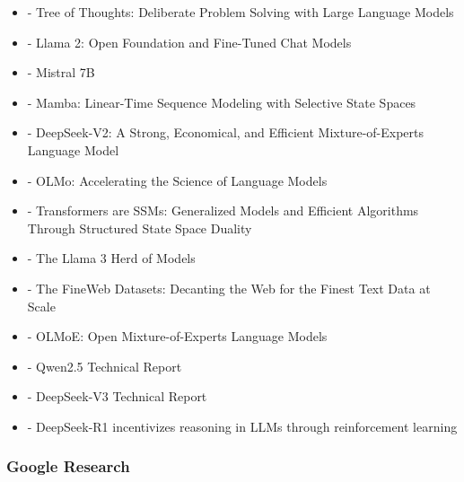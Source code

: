 \documentclass[
  letterpaper,
  DIV=11,
  numbers=noendperiod]{scrartcl}
\begin{document}
\begin{itemize}
  Preference Optimization: Your Language Model is Secretly a Reward
  Model
\item
  \autocite{yao2023treethoughtsdeliberateproblem} - Tree of Thoughts:
  Deliberate Problem Solving with Large Language Models
\item
  \autocite{touvron2023llama2openfoundation} - Llama 2: Open Foundation
  and Fine-Tuned Chat Models
\item
  \autocite{jiang2023mistral7b} - Mistral 7B
\item
  \autocite{gu2024mambalineartimesequencemodeling} - Mamba: Linear-Time
  Sequence Modeling with Selective State Spaces
\item
  \autocite{deepseekai2024deepseekv2strongeconomicalefficient} -
  DeepSeek-V2: A Strong, Economical, and Efficient Mixture-of-Experts
  Language Model
\item
  \autocite{groeneveld-etal-2024-olmo} - OLMo: Accelerating the Science
  of Language Models
\item
  \autocite{dao2024transformersssmsgeneralizedmodels} - Transformers are
  SSMs: Generalized Models and Efficient Algorithms Through Structured
  State Space Duality
\item
  \autocite{grattafiori2024llama3herdmodels} - The Llama 3 Herd of
  Models
\item
  \autocite{penedo2024finewebdatasetsdecantingweb} - The FineWeb
  Datasets: Decanting the Web for the Finest Text Data at Scale
\item
  \autocite{muennighoff2025olmoeopenmixtureofexpertslanguage} - OLMoE:
  Open Mixture-of-Experts Language Models
\item
  \autocite{qwen2025qwen25technicalreport} - Qwen2.5 Technical Report
\item
  \autocite{deepseekai2025deepseekv3technicalreport} - DeepSeek-V3
  Technical Report
\item
  \autocite{Guo_2025} - DeepSeek-R1 incentivizes reasoning in LLMs
  through reinforcement learning
\end{itemize}

\subsubsection{Google Research}\label{google-research}
\end{document}
